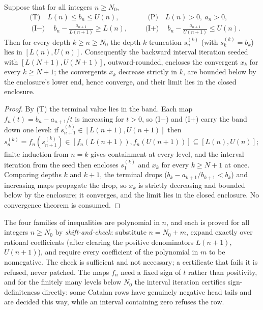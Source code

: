 \documentclass[11pt]{article}
\theoremstyle{definition}
\theoremstyle{plain}
\begin{document}
\begin{lemma}\label{lem:band}
Suppose that for all integers $n\ge N_0$,
\begin{align*}
&\text{(T)}\quad L(n)\le b_n\le U(n),\qquad\qquad\text{(P)}\quad L(n)>0,\ a_n>0,\\
&\text{(I$-$)}\quad b_n-\frac{a_{n+1}}{L(n+1)}\ge L(n),\qquad\ \text{(I$+$)}\quad b_n-\frac{a_{n+1}}{U(n+1)}\le U(n).
\end{align*}
Then for every depth $k\ge n\ge N_0$ the depth-$k$ truncation $s^{(k)}_n$ (with $s^{(k)}_k=b_k$) lies in $[L(n),U(n)]$. Consequently the backward interval iteration seeded with $[L(N+1),U(N+1)]$, outward-rounded, encloses the convergent $x_k$ for every $k\ge N+1$; the convergents $x_k$ decrease strictly in $k$, are bounded below by the enclosure's lower end, hence converge, and their limit lies in the closed enclosure.
\end{lemma}
\begin{proof}
By (T) the terminal value lies in the band. Each map $f_n(t)=b_n-a_{n+1}/t$ is increasing for $t>0$, so (I$-$) and (I$+$) carry the band down one level: if $s^{(k)}_{n+1}\in[L(n+1),U(n+1)]$ then $s^{(k)}_n=f_n(s^{(k)}_{n+1})\in[f_n(L(n+1)),f_n(U(n+1))]\subseteq[L(n),U(n)]$; finite induction from $n=k$ gives containment at every level, and the interval iteration from the seed then encloses $s^{(k)}_1$ and $x_k$ for every $k\ge N+1$ at once. Comparing depths $k$ and $k+1$, the terminal drops ($b_k-a_{k+1}/b_{k+1}<b_k$) and increasing maps propagate the drop, so $x_k$ is strictly decreasing and bounded below by the enclosure; it converges, and the limit lies in the closed enclosure. No convergence theorem is consumed.
\end{proof}

The four families of inequalities are polynomial in $n$, and each is proved for all integers $n\ge N_0$ by \emph{shift-and-check}: substitute $n=N_0+m$, expand exactly over rational coefficients (after clearing the positive denominators $L(n+1)$, $U(n+1)$), and require every coefficient of the polynomial in $m$ to be nonnegative. The check is sufficient and not necessary; a certificate that fails it is refused, never patched. The maps $f_n$ need a fixed sign of $t$ rather than positivity, and for the finitely many levels below $N_0$ the interval iteration certifies sign-definiteness directly: some Catalan rows have genuinely negative head tails and are decided this way, while an interval containing zero refuses the row.
\end{document}

